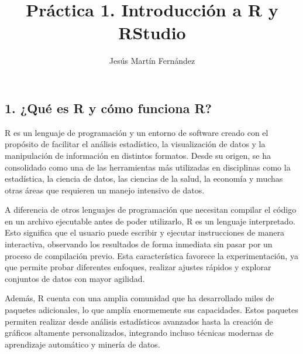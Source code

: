\documentclass[
  letterpaper,
  DIV=11,
  numbers=noendperiod]{scrartcl}
\title{{Práctica 1. Introducción a R y RStudio}}
\author{Jesús Martín Fernández}
\date{}
\renewcommand*\contentsname{Table of contents}
\newcommand\contentsname{Table of contents}
\begin{document}
\maketitle
\ifdefined\Shaded\renewenvironment{Shaded}{\begin{tcolorbox}[frame hidden, interior hidden, boxrule=0pt, borderline west={3pt}{0pt}{shadecolor}, sharp corners, breakable, enhanced]}{\end{tcolorbox}}\fi

\renewcommand*\contentsname{Contenidos}
{
\hypersetup{linkcolor=}
\setcounter{tocdepth}{3}
\tableofcontents
}
\hypertarget{section}{%
\subsection{}\label{section}}

\hypertarget{quuxe9-es-r-y-cuxf3mo-funciona-r}{%
\subsection{1. ¿Qué es R y cómo funciona
R?}\label{quuxe9-es-r-y-cuxf3mo-funciona-r}}

R es un lenguaje de programación y un entorno de software creado con el
propósito de facilitar el análisis estadístico, la visualización de
datos y la manipulación de información en distintos formatos. Desde su
origen, se ha consolidado como una de las herramientas más utilizadas en
disciplinas como la estadística, la ciencia de datos, las ciencias de la
salud, la economía y muchas otras áreas que requieren un manejo
intensivo de datos.

A diferencia de otros lenguajes de programación que necesitan compilar
el código en un archivo ejecutable antes de poder utilizarlo, R es un
lenguaje interpretado. Esto significa que el usuario puede escribir y
ejecutar instrucciones de manera interactiva, observando los resultados
de forma inmediata sin pasar por un proceso de compilación previo. Esta
característica favorece la experimentación, ya que permite probar
diferentes enfoques, realizar ajustes rápidos y explorar conjuntos de
datos con mayor agilidad.

Además, R cuenta con una amplia comunidad que ha desarrollado miles de
paquetes adicionales, lo que amplía enormemente sus capacidades. Estos
paquetes permiten realizar desde análisis estadísticos avanzados hasta
la creación de gráficos altamente personalizados, integrando incluso
técnicas modernas de aprendizaje automático y minería de datos.
\end{document}
